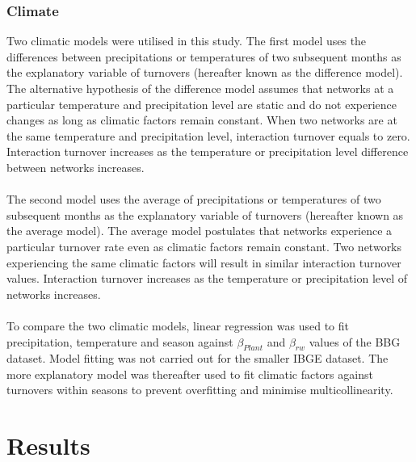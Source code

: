 \documentclass[11pt]{article}
\begin{document}
\subsubsection{Climate}
Two climatic models were utilised in this study. The first model uses the differences between precipitations or temperatures of two subsequent months as the explanatory variable of turnovers (hereafter known as the difference model). The alternative hypothesis of the difference model assumes that networks at a particular temperature and precipitation level are static and do not experience changes as long as climatic factors remain constant. When two networks are at the same temperature and precipitation level, interaction turnover equals to zero. Interaction turnover increases as the temperature or precipitation level difference between networks increases.\\
\\
The second model uses the average of precipitations or temperatures of two subsequent months as the explanatory variable of turnovers (hereafter known as the average model). The average model postulates that networks experience a particular turnover rate even as climatic factors remain constant. Two networks experiencing the same climatic factors will result in similar interaction turnover values. Interaction turnover increases as the temperature or precipitation level of networks increases.\\
\\
To compare the two climatic models, linear regression was used to fit precipitation, temperature and season against $\beta_{Plant}$ and $\beta_{rw}$ values of the BBG dataset. Model fitting was not carried out for the smaller IBGE dataset. The more explanatory model was thereafter used to fit climatic factors against turnovers within seasons to prevent overfitting and minimise multicollinearity.

\newpage
\section{Results} %
\end{document}
